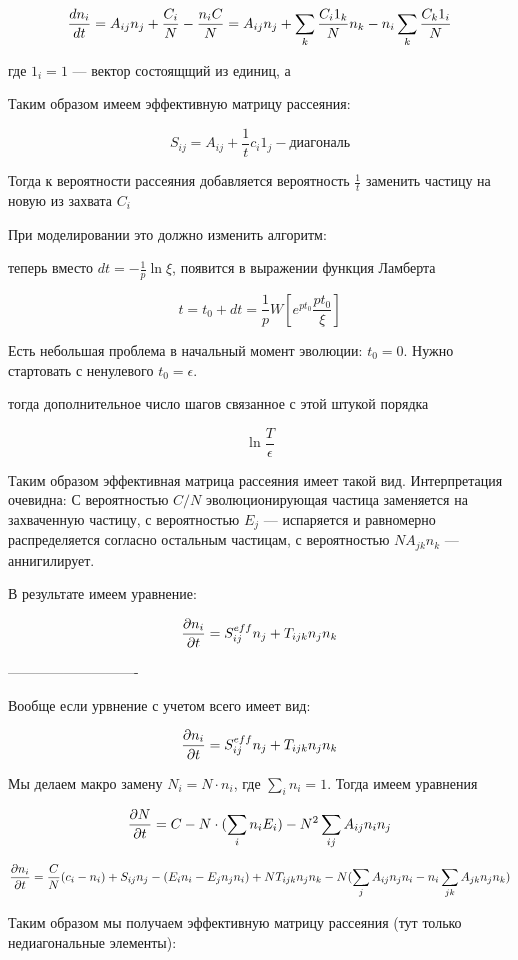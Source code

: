 \[
\frac{d n_i}{d t} = A_{ij} n_j + \frac{C_i}{N} - \frac{n_i C}{N} = A_{ij} n_j + 
	\sum_k \frac{C_i 1_k}{N} n_k - n_i \sum_k \frac{C_k 1_i}{N}
\]


где $1_i = 1$ --- вектор состоящщий из единиц, а 
 
Таким образом имеем эффективную матрицу рассеяния:

\[
	S_{ij} = A_{ij} + \frac{1}{t} c_i 1_j - диагональ
\]

Тогда к вероятности рассеяния добавляется вероятность $\frac{1}{t}$ 
заменить частицу на новую из захвата $C_i$

При моделировании это должно изменить алгоритм:

теперь вместо $dt = -\frac{1}{p} \ln \xi$, появится в выражении функция Ламберта

\[
	t = t_0 + dt = \frac{1}{p} W\left[ e^{pt_0} \frac{p t_0}{\xi} \right]
\]

Есть небольшая проблема в начальный момент эволюции: $t_0 = 0$. Нужно стартовать с ненулевого $t_0 = \epsilon$.

тогда дополнительное число шагов связанное с этой штукой порядка

\[
	\ln \frac{T}{\epsilon} 
\]

Таким образом эффективная матрица рассеяния имеет такой вид. Интерпретация очевидна:
С вероятностью $C/N$ эволюционирующая частица заменяется на захваченную частицу, 
с вероятностью $E_j$ --- испаряется и равномерно распределяется согласно остальным частицам, 
с вероятностью $N A_{jk} n_k$ --- аннигилирует.

В результате имеем уравнение:

\[
	\frac{\partial n_i}{\partial t} = S^{eff}_{ij} n_j + T_{ijk} n_j n_k
\]

----------------------------

Вообще если урвнение с учетом всего имеет вид:

\[
	\frac{\partial n_i}{\partial t} = S^{eff}_{ij} n_j + T_{ijk} n_j n_k
\]

Мы делаем макро замену $N_i = N\cdot n_i$, где $\sum_i n_i = 1$. Тогда имеем уравнения

\[
	\frac{\partial N}{\partial t} = C - N \cdot (\sum_{i} n_i E_i) - N^2 \sum_{ij} {A_{ij} n_i n_j}
\]

\[
	\frac{\partial n_i}{\partial t} = \frac{C}{N}(c_i - n_i) + S_{ij}n_j - (E_i n_i - E_j n_j n_i ) + 
	N T_{ijk} n_j n_k - N(\sum_j A_{ij} n_j n_i - n_i \sum_{jk} A_{jk} n_j n_k) 
\]

Таким образом мы получаем эффективную матрицу рассеяния (тут только недиагональные элементы):

